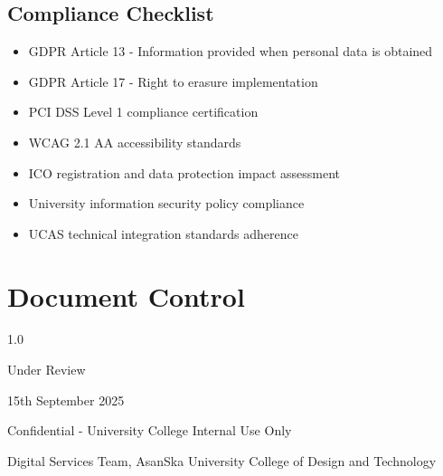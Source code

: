 \documentclass[11pt]{article}
\begin{document}
\subsection{Compliance Checklist}
\begin{itemize}[label=\checkmark]
    \item GDPR Article 13 - Information provided when personal data is obtained
    \item GDPR Article 17 - Right to erasure implementation
    \item PCI DSS Level 1 compliance certification
    \item WCAG 2.1 AA accessibility standards
    \item ICO registration and data protection impact assessment
    \item University information security policy compliance
    \item UCAS technical integration standards adherence
\end{itemize}

\section*{Document Control}

\begin{description}[font=\normalfont\sffamily\bfseries,labelwidth=3cm,leftmargin=3.2cm]
    \item[Version] 1.0
    \item[Status] Under Review
    \item[Next Review Date] 15th September 2025
    \item[Classification] Confidential - University College Internal Use Only
    \item[Document Owner] Digital Services Team, AsanSka University College of Design and Technology
\end{description}
\end{document}
